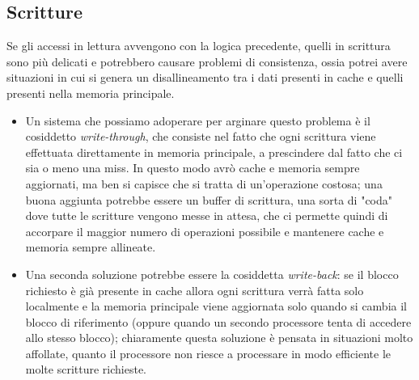 \documentclass[class=book, crop=false, oneside]{standalone}
\begin{document}
\subsection{Scritture}
Se gli accessi in lettura avvengono con la logica precedente, quelli in scrittura sono più delicati e potrebbero causare problemi di consistenza, ossia potrei avere situazioni in cui si genera un disallineamento tra i dati presenti in cache e quelli presenti nella memoria principale.
\begin{itemize}
  \item Un sistema che possiamo adoperare per arginare questo problema è il cosiddetto \emph{write-through}, che consiste nel fatto che ogni scrittura viene effettuata direttamente in memoria principale, a prescindere dal fatto che ci sia o meno una miss. In questo modo avrò cache e memoria sempre aggiornati, ma ben si capisce che si tratta di un'operazione costosa; una buona aggiunta potrebbe essere un buffer di scrittura, una sorta di "coda" dove tutte le scritture vengono messe in attesa, che ci permette quindi di accorpare il maggior numero di operazioni possibile e mantenere cache e memoria sempre allineate.
  \item Una seconda soluzione potrebbe essere la cosiddetta \emph{write-back}: se il blocco richiesto è già presente in cache allora ogni scrittura verrà fatta solo localmente e la memoria principale viene aggiornata solo quando si cambia il blocco di riferimento (oppure quando un secondo processore tenta di accedere allo stesso blocco); chiaramente questa soluzione è pensata in situazioni molto affollate, quanto il processore non riesce a processare in modo efficiente le molte scritture richieste.
\end{itemize}
\end{document}

